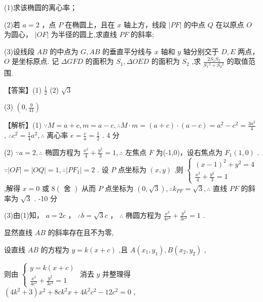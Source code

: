 \documentclass[10pt]{article}
\begin{document}
(1)求该椭圆的离心率；

(2)若 \(a = 2\) ，点 \(P\) 在椭圆上，且在 \(x\) 轴上方，线段 \(\left| {PF}\right|\) 的中点 \(Q\) 在以原点 \(O\) 为圆心， \(\left| {OF}\right|\) 为半径的圆上,求直线 \({PF}\) 的斜率;

(3)设线段 \({AB}\) 的中点为 \(G,{AB}\) 的垂直平分线与 \(x\) 轴和 \(y\) 轴分别交于 \(D,E\) 两点， \(O\) 是坐标原点. 记 \({\Delta GFD}\) 的面积为 \({S}_{1},{\Delta OED}\) 的面积为 \({S}_{2}\) ,求 \(\frac{2{S}_{1}{S}_{2}}{{S}_{1}{}^{2} + {S}_{2}{}^{2}}\) 的取值范围.

【答案】(1) \(\frac{1}{2}\) (2) \(\sqrt{3}\)

(3) \(\left( {0,\frac{9}{41}}\right)\)

【解析】(1) \(\because M = a + c,m = a - c,\therefore M \cdot  m = \left( {a + c}\right)  \cdot  \left( {a - c}\right)  = {a}^{2} - {c}^{2} = \frac{3{a}^{2}}{4}\) , \(\therefore {c}^{2} = \frac{1}{4}{a}^{2},\therefore\) 离心率 \(e = \frac{c}{a} = \frac{1}{2}\) . 4 分

(2) \(\because a = 2,\therefore\) 椭圆方程为 \(\frac{{x}^{2}}{4} + \frac{{y}^{2}}{3} = 1,\therefore\) 左焦点 \(F\) 为(-1,0)，设右焦点为 \({F}_{1}\left( {1,0}\right)\) . \(\because \left| {OF}\right|  = \left| {OQ}\right|  = 1,\therefore \left| {P{F}_{1}}\right|  = 2\) . 设 \(P\) 点坐标为 \(\left( {x,y}\right)\) ,则 \(\left\{  \begin{array}{l} {\left( x - 1\right) }^{2} + {y}^{2} = 4 \\  \frac{{x}^{2}}{4} + \frac{{y}^{2}}{3} = 1 \end{array}\right.\) ,解得 \(x = 0\) 或 \(8\left( \text{ 舍 }\right)\) 从而 \(P\) 点坐标为 \(\left( {0,\sqrt{3}}\right) ,\therefore {k}_{PF} = \sqrt{3},\therefore\) 直线 \({PF}\) 的斜率为 \(\sqrt{3}\) . -10 分

(3)由(1)知， \(a = {2c}\) ， \(\therefore b = \sqrt{3}c\) ， \(\therefore\) 椭圆方程为 \(\frac{{x}^{2}}{4{c}^{2}} + \frac{{y}^{2}}{3{c}^{2}} = 1\) .

显然直线 \({AB}\) 的斜率存在且不为零,

设直线 \({AB}\) 的方程为 \(y = k\left( {x + c}\right)\) ,且 \(A\left( {{x}_{1},{y}_{1}}\right) ,B\left( {{x}_{2},{y}_{2}}\right)\) ,

则由 \(\left\{  \begin{array}{l} y = k\left( {x + c}\right) \\  \frac{{x}^{2}}{4{c}^{2}} + \frac{{y}^{2}}{3{c}^{2}} = 1 \end{array}\right.\) 消去 \(y\) 并整理得 \(\left( {4{k}^{2} + 3}\right) {x}^{2} + {8c}{k}^{2}x + 4{k}^{2}{c}^{2} - {12}{c}^{2} = 0\) ,
\end{document}
